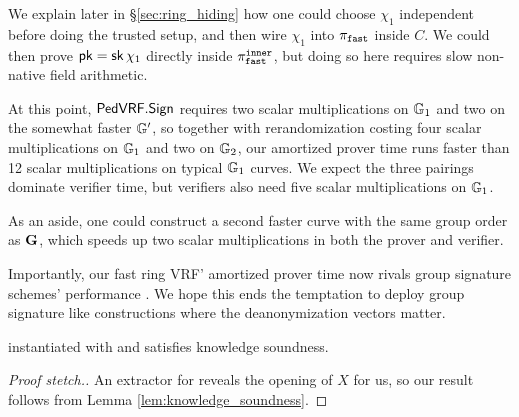 We explain later in \S\ref{sec:ring_hiding} how one could
choose $\chi_1$ independent before doing the trusted setup,
 and then wire $\chi_1$ into $\pi_{\mathtt{fast}}$ inside $C$.
We could then prove $\mathsf{pk} = \mathsf{sk}\, \chi_1$ directly inside $\pi_{\mathtt{fast}}^{\mathtt{inner}}$,
but doing so here requires slow non-native field arithmetic.

At this point, ${\mathsf{PedVRF}}.{\mathsf{Sign}}$ requires two scalar multiplications on ${\mathbb{G}}_1$
 and two on the somewhat faster ${\mathbb{G}}'$,
so together with rerandomization costing four scalar multiplications
on ${\mathbb{G}}_1$ and two on ${\mathbb{G}}_2$, our amortized prover time
 runs faster than 12 scalar multiplications on typical ${\mathbb{G}}_1$ curves. 
We expect the three pairings dominate verifier time, but
 verifiers also need five scalar multiplications on ${\mathbb{G}}_1$.

As an aside, one could construct a second faster curve with the same
group order as ${\mathbf{G}}$, which speeds up two scalar multiplications
 in both the prover and verifier. 

Importantly, our fast ring VRF' amortized prover time now rivals
group signature schemes' performance \cite{group_sig_survey,}.
We hope this ends the temptation to deploy group signature like
 constructions where the deanonymization vectors matter.


\begin{theorem}\label{thm:knowledge_soundness}
\rVRF instantiated with \pifast and \PedVRF satisfies knowledge soundness.
\end{theorem}

\begin{proof}[Proof stetch.]
An extractor for \PedVRF reveals the opening of $X$ for us,
so our result follows from Lemma \ref{lem:knowledge_soundness}.
\end{proof}


%



